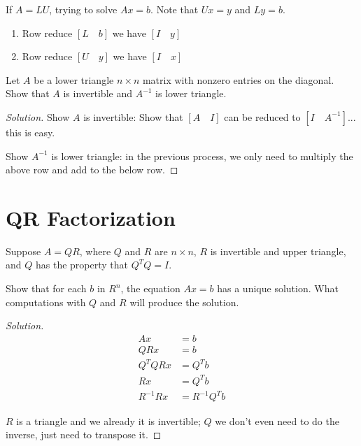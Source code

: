 \begin{note}
    If \(A = LU\), trying to solve \(Ax = b\). 
    Note that \(Ux = y\) and \(Ly = b\).

    \begin{enumerate}
        \item Row reduce \([L \quad b]\) we have \([I \quad y]\)  
        \item Row reduce \([U \quad y]\) we have \([I \quad x]\)  
    \end{enumerate}
\end{note}

\begin{problem}
    Let \(A\) be a lower triangle \(n \times n\) matrix with nonzero entries on the diagonal. 
    Show that \(A\) is invertible and \(A^{-1}\) is lower triangle.  
\end{problem}
\begin{proof}[Solution]
    Show \(A\) is invertible:  
    Show that \([A \quad I]\) can be reduced to \([I \quad A^{-1}]\)... this is easy.

    Show \(A^{-1}\) is lower triangle: in the previous process, we only need to multiply the above row and add to the below row.
\end{proof}


\section{QR Factorization}
\begin{problem}
    Suppose \(A = QR\), where \(Q\) and \(R\) are \(n \times n\), 
    \(R\) is invertible and upper triangle, 
    and \(Q\) has the property that \(Q^TQ = I\).   

    Show that for each \(b\) in \(R^n\), the equation \(Ax = b\) has a unique solution.   
    What computations with \(Q\) and \(R\) will produce the solution.  
\end{problem}
\begin{proof}[Solution]
    \begin{align*}
        Ax &= b \\
        QR x &= b \\
        Q^T Q R x &= Q^T b \\
        R x &= Q^T b \\
        R^{-1} R x &= R^{-1} Q^T b
    \end{align*}

    \(R\) is a triangle and we already it is invertible; \(Q\) we don't even need to do the inverse, just need to transpose it.  
\end{proof}

